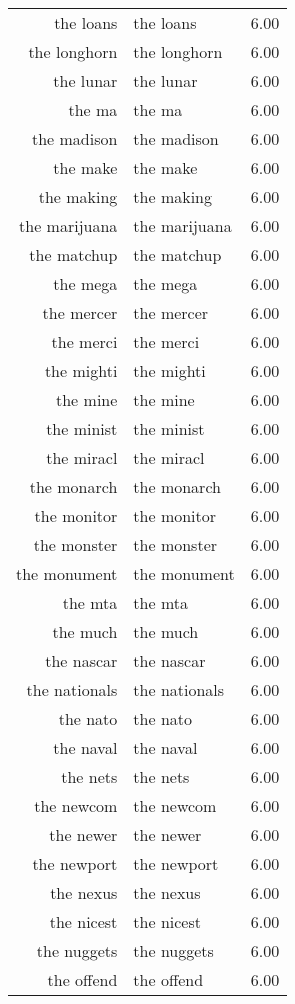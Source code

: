 \begin{table}[ht]
\begin{tabular}{rlr}
  the loans & the loans & 6.00 \\ 
  the longhorn & the longhorn & 6.00 \\ 
  the lunar & the lunar & 6.00 \\ 
  the ma & the ma & 6.00 \\ 
  the madison & the madison & 6.00 \\ 
  the make & the make & 6.00 \\ 
  the making & the making & 6.00 \\ 
  the marijuana & the marijuana & 6.00 \\ 
  the matchup & the matchup & 6.00 \\ 
  the mega & the mega & 6.00 \\ 
  the mercer & the mercer & 6.00 \\ 
  the merci & the merci & 6.00 \\ 
  the mighti & the mighti & 6.00 \\ 
  the mine & the mine & 6.00 \\ 
  the minist & the minist & 6.00 \\ 
  the miracl & the miracl & 6.00 \\ 
  the monarch & the monarch & 6.00 \\ 
  the monitor & the monitor & 6.00 \\ 
  the monster & the monster & 6.00 \\ 
  the monument & the monument & 6.00 \\ 
  the mta & the mta & 6.00 \\ 
  the much & the much & 6.00 \\ 
  the nascar & the nascar & 6.00 \\ 
  the nationals & the nationals & 6.00 \\ 
  the nato & the nato & 6.00 \\ 
  the naval & the naval & 6.00 \\ 
  the nets & the nets & 6.00 \\ 
  the newcom & the newcom & 6.00 \\ 
  the newer & the newer & 6.00 \\ 
  the newport & the newport & 6.00 \\ 
  the nexus & the nexus & 6.00 \\ 
  the nicest & the nicest & 6.00 \\ 
  the nuggets & the nuggets & 6.00 \\ 
  the offend & the offend & 6.00 \\ 

\end{tabular}
\end{table}
